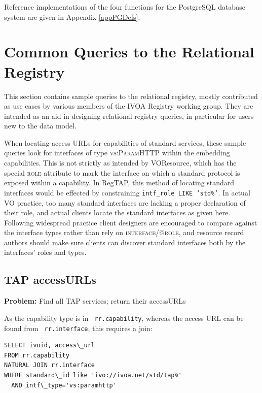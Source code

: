 \documentclass[11pt,a4paper]{ivoa}
\newcommand{\rtent}[1]{\texttt{\color{rtcolor} #1}}
\newcommand{\vorent}[1]{\textsc{#1}}
\begin{document}
Reference implementations of the four functions for the PostgreSQL
database system are given in Appendix \ref{appPGDefs}.




\section{Common Queries to the Relational Registry}

\label{sample_queries}

This section contains sample queries to the relational registry,
mostly contributed as use cases by various members of the IVOA Registry
working group.  They are intended as an aid in designing relational
registry queries, in particular for users new to the data model.

When locating access URLs for capabilities of standard services, these
sample queries look for interfaces of type \vorent{vs:ParamHTTP} within
the embedding capabilities.  This is not strictly as intended by
VOResource, which has the special \vorent{role} attribute to mark the
interface on which a standard protocol is exposed within a capability.
In RegTAP, this method of locating standard interfaces would be effected
by constraining \texttt{intf\_role LIKE 'std\%'}.  In actual VO
practice, too many standard interfaces are lacking a proper declaration
of their role, and actual clients locate the standard interfaces as
given here.  Following widespread practice client designers are
encouraged to compare against the interface types rather than rely on
\vorent{interface/@role}, and resource record authors should make sure
clients can discover standard interfaces both by the interfaces' roles
and types.


\subsection{TAP accessURLs}
\textbf{Problem:} Find all TAP services; return their accessURLs

As the capability type is in 
\rtent{rr.capability}, whereas the access URL can be
found from 
\rtent{rr.interface}, this requires
a join:


\begin{verbatim}
SELECT ivoid, access\_url 
FROM rr.capability
NATURAL JOIN rr.interface
WHERE standard\_id like 'ivo://ivoa.net/std/tap%'
  AND intf\_type='vs:paramhttp'
\end{verbatim}
\end{document}

